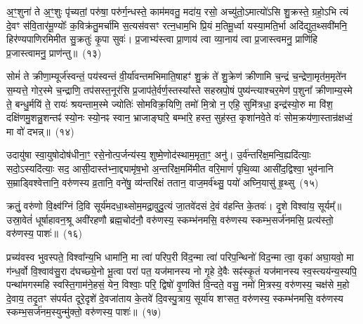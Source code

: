 अ॒ꣳ॒शुना॑ ते अ॒ꣳ॒शुः पृ॑च्यतां॒ परु॑षा॒ परु॑र्ग॒न्धस्ते॒ काम॑मवतु॒ मदा॑य॒ रसो॒ अच्यु॑तो॒\-ऽमात्यो॑\-ऽसि शु॒क्रस्ते॒ ग्रहो॒\-ऽभि त्यं दे॒वꣳ स॑वि॒तार॑मू॒ण्योः᳚ क॒विक्र॑तु॒मर्चा॑मि स॒त्यस॑वसꣳ रत्न॒धाम॒भि प्रि॒यं म॒तिमू॒र्ध्वा यस्या॒मति॒र्भा अदि॑द्युत॒थ्सवी॑मनि॒ हिर॑ण्यपाणिरमिमीत सु॒क्रतुः॑ कृ॒पा सुवः॑। प्र॒जाभ्य॑स्त्वा प्रा॒णाय॑ त्वा व्या॒नाय॑ त्वा प्र॒जास्त्वमनु॒ प्राणि॑हि प्र॒जास्त्वामनु॒ प्राण॑न्तु॥~(१३)\ip

{\anuvakamend[{अनु॑ स॒प्त च॑}]}

सोमं॑ ते क्रीणा॒म्यूर्ज॑स्वन्तं॒ पय॑स्वन्तं वी॒र्या॑वन्तमभिमाति॒\-षाहꣳ॑ शु॒क्रं ते॑ शु॒क्रेण॑ क्रीणामि च॒न्द्रं च॒न्द्रेणा॒मृत॑म॒मृते॑न स॒म्यत्ते॒ गोर॒स्मे च॒न्द्राणि॒ तप॑सस्त॒नूर॑सि प्र॒जा\-प॑ते॒र्वर्ण॒स्तस्या᳚स्ते सहस्रपो॒षं पुष्य॑न्त्याश्चर॒मेण॑ प॒शुना᳚ क्रीणाम्य॒स्मे ते॒ बन्धु॒र्मयि॑ ते॒ रायः॑ श्रयन्ताम॒स्मे ज्योतिः॑ सोम\-विक्र॒यिणि॒ तमो॑ मि॒त्रो न॒ एहि॒ सुमि॑त्रधा॒ इन्द्र॑स्यो॒रु मा वि॑श॒ दक्षि॑णमु॒शन्नु॒शन्तꣴ॑ स्यो॒नः स्यो॒नꣴ स्वान॒ भ्राजाङ्घा॑रे॒ बम्भा॑रे॒ हस्त॒ सुह॑स्त॒ कृशा॑नवे॒ते वः॑ सोम॒\-क्रय॑णा॒स्तान्र॑क्षध्वं॒ मा वो॑ दभन्न्॥~(१४)\ip

{\anuvakamend[{ऊ॒रुं द्वाविꣳ॑शतिश्व}]}

उदायु॑षा स्वा॒युषोदोष॑धीना॒ꣳ॒ रसे॒नोत्प॒र्जन्य॑स्य॒ शुष्मे॒णोद॑स्था\-म॒मृता॒ꣳ॒ अनु॑। उ॒र्व॑न्तरि॑क्ष॒मन्वि॒ह्यदि॑त्याः॒ सदो॒\-ऽस्यदि॑त्याः॒ सद॒ आसी॒\-दास्त॑भ्ना॒द्द्यामृ॑ष॒भो अ॒न्तरि॑क्ष॒ममि॑मीत वरि॒माणं॑ पृथि॒व्या आसी॑द॒द्विश्वा॒ भुव॑नानि स॒म्राड्विश्वेत्तानि॒ वरु॑णस्य व्र॒तानि॒ वने॑षु॒ व्य॑न्तरि॑क्षं ततान॒ वाज॒मर्व॑थ्सु॒ पयो॑ अघ्नि॒यासु॑ हृ॒थ्सु~(१५)\ip

क्रतुं॒ वरु॑णो वि॒क्ष्व॑ग्निं दि॒वि सूर्य॑मदधा॒थ्सोम॒मद्रा॒वुदु॒त्यं जा॒तवे॑दसं दे॒वं व॑हन्ति के॒तवः॑। दृ॒शे विश्वा॑य॒ सूर्यम्᳚॥ उस्रा॒वेतं॑ धूर्\mbox{}षाहावन॒श्रू अवी॑रहणौ ब्रह्म॒चोद॑नौ॒ वरु॑णस्य॒ स्कम्भ॑नमसि॒ वरु॑णस्य स्कम्भ॒सर्ज॑नमसि॒ प्रत्य॑स्तो॒ वरु॑णस्य॒ पाशः॑॥~(१६)\ip

{\anuvakamend[{हृ॒थ्सु पञ्च॑त्रिꣳशच्च}]}

प्रच्य॑वस्व भुवस्पते॒ विश्वा᳚न्य॒भि धामा॑नि॒ मा त्वा॑ परिप॒री वि॑द॒न्मा त्वा॑ परिप॒न्थिनो॑ विद॒न्मा त्वा॒ वृका॑ अघा॒यवो॒ मा ग॑न्ध॒र्वो वि॒श्वाव॑सु॒रा द॑घच्छ्ये॒नो भू॒त्वा परा॑ पत॒ यज॑मानस्य नो गृ॒हे दे॒वैः सꣴ॑स्कृ॒तं यज॑मानस्य स्व॒स्त्यय॑न्य॒स्यपि॒ पन्था॑मगस्महि स्वस्ति॒गाम॑ने॒हसं॒ येन॒ विश्वाः॒ परि॒ द्विषो॑ वृ॒णक्ति॑ वि॒न्दते॒ वसु॒ नमो॑ मि॒त्रस्य॒ वरु॑णस्य॒ चक्ष॑से म॒हो दे॒वाय॒ तदृ॒तꣳ स॑पर्यत दूरे॒\-दृशे॑ दे॒व\-जा॑ताय के॒तवे॑ दि॒वस्पु॒त्राय॒ सूर्या॑य शꣳसत॒ वरु॑णस्य॒ स्कम्भ॑\-नमसि॒ वरु॑णस्य स्कम्भ॒\-सर्ज॑नम॒स्युन्मु॑क्तो॒ वरु॑णस्य॒ पाशः॑॥~(१७)\ip

